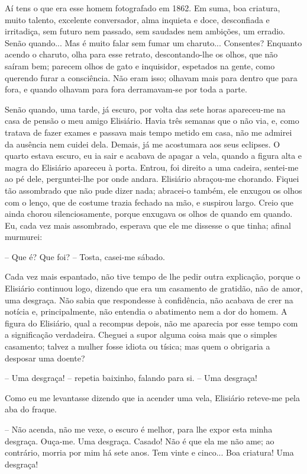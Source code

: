 Aí tens o que era esse homem fotografado em 1862. Em suma, boa criatura,
muito talento, excelente conversador, alma inquieta e doce, desconfiada
e irritadiça, sem futuro nem passado, sem saudades nem ambições, um
erradio. Senão quando... Mas é muito falar sem fumar um charuto...
Consentes? Enquanto acendo o charuto, olha para esse retrato,
descontando-lhe os olhos, que não saíram bem; parecem olhos de gato e
inquisidor, espetados na gente, como querendo furar a consciência. Não
eram isso; olhavam mais para dentro que para fora, e quando olhavam para
fora derramavam-se por toda a parte.

Senão quando, uma tarde, já escuro, por volta das sete horas apareceu-me
na casa de pensão o meu amigo Elisiário. Havia três semanas que o não
via, e, como tratava de fazer exames e passava mais tempo metido em
casa, não me admirei da ausência nem cuidei dela. Demais, já me
acostumara aos seus eclipses. O quarto estava escuro, eu ia sair e
acabava de apagar a vela, quando a figura alta e magra do Elisiário
apareceu à porta. Entrou, foi direito a uma cadeira, sentei-me ao pé
dele, perguntei-lhe por onde andara. Elisiário abraçou-me chorando.
Fiquei tão assombrado que não pude dizer nada; abracei-o também, ele
enxugou os olhos com o lenço, que de costume trazia fechado na mão, e
suspirou largo. Creio que ainda chorou silenciosamente, porque enxugava
os olhos de quando em quando. Eu, cada vez mais assombrado, esperava que
ele me dissesse o que tinha; afinal murmurei:

-- Que é? Que foi? -- Tosta, casei-me sábado.

Cada vez mais espantado, não tive tempo de lhe pedir outra explicação,
porque o Elisiário continuou logo, dizendo que era um casamento de
gratidão, não de amor, uma desgraça. Não sabia que respondesse à
confidência, não acabava de crer na notícia e, principalmente, não
entendia o abatimento nem a dor do homem. A figura do Elisiário, qual a
recompus depois, não me aparecia por esse tempo com a significação
verdadeira. Cheguei a supor alguma coisa mais que o simples casamento;
talvez a mulher fosse idiota ou tísica; mas quem o obrigaria a desposar
uma doente?

-- Uma desgraça! -- repetia baixinho, falando para si. -- Uma desgraça!

Como eu me levantasse dizendo que ia acender uma vela, Elisiário
reteve-me pela aba do fraque.

-- Não acenda, não me vexe, o escuro é melhor, para lhe expor esta minha
desgraça. Ouça-me. Uma desgraça. Casado! Não é que ela me não ame; ao
contrário, morria por mim há sete anos. Tem vinte e cinco... Boa
criatura! Uma desgraça!

